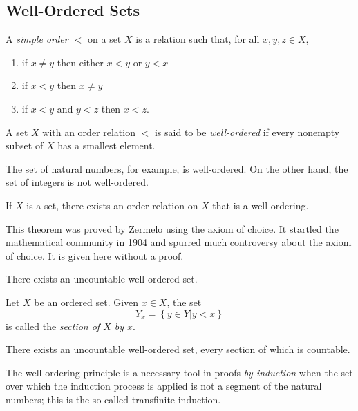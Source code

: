 \subsection{Well-Ordered Sets}

A \emph{simple order $<$} on a set $X$ is a relation such that, for all $x, y, z \in X$,
\begin{enumerate}
\item if $x \neq y$ then either $x < y$ or $y < x$
\item if $x < y$ then $x \neq y$
\item if $x < y$ and $y < z$ then $x < z$.
\end{enumerate}

\begin{definition}
A set $X$ with an order relation $<$ is said to be \emph{well-ordered} if every nonempty subset of $X$ has a smallest element.
\end{definition}

The set of natural numbers, for example, is well-ordered.
On the other hand, the set of integers is not well-ordered.

\begin{fact}
If $X$ is a set, there exists an order relation on $X$ that is a well-ordering.
\end{fact}

This theorem was proved by Zermelo using the axiom of choice.
It startled the mathematical community in 1904 and spurred much controversy about the axiom of choice.
It is given here without a proof.

\begin{corollary}
There exists an uncountable well-ordered set.
\end{corollary}

\begin{definition}
Let $X$ be an ordered set.
Given $x \in X$, the set
\begin{equation*}
Y_x = \left\{ y \in Y | y < x \right\}
\end{equation*}
is called the \emph{section of $X$ by $x$}.
\end{definition}

\begin{corollary}
There exists an uncountable well-ordered set, every section of which is countable.
\end{corollary}

The well-ordering principle is a necessary tool in proofs \emph{by induction} when the set over which the induction process is applied is not a segment of the natural numbers; this is the so-called transfinite induction.


